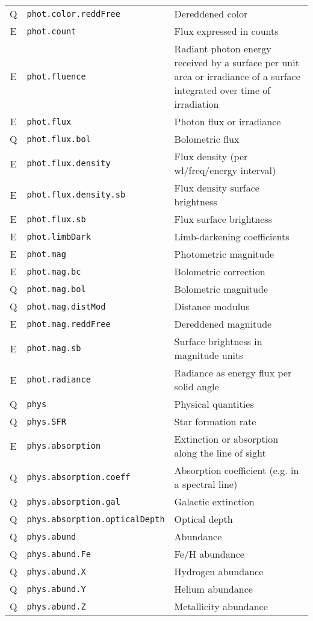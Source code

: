 \documentclass[11pt,a4paper]{ivoa}
\begin{document}
\begin{longtable}[h!]{c|p{40ex}|p{}}
Q & {\tt phot.color.reddFree} & Dereddened color\\
E & {\tt phot.count} & Flux expressed in counts\\
E & {\tt phot.fluence} & Radiant photon energy received by a surface per unit area or irradiance of a surface integrated over time of irradiation\\
E & {\tt phot.flux} & Photon flux or irradiance\\
Q & {\tt phot.flux.bol} & Bolometric flux\\
E & {\tt phot.flux.density} & Flux density (per wl/freq/energy interval)\\
E & {\tt phot.flux.density.sb} & Flux density surface brightness\\
E & {\tt phot.flux.sb} & Flux surface brightness\\
E & {\tt phot.limbDark} & Limb-darkening coefficients\\
E & {\tt phot.mag} & Photometric magnitude\\
E & {\tt phot.mag.bc} & Bolometric correction\\
Q & {\tt phot.mag.bol} & Bolometric magnitude\\
Q & {\tt phot.mag.distMod} & Distance modulus\\
E & {\tt phot.mag.reddFree} & Dereddened magnitude\\
E & {\tt phot.mag.sb} & Surface brightness in magnitude units\\
E & {\tt phot.radiance} & Radiance as energy flux per solid angle\\
Q & {\tt phys} & Physical quantities\\
Q & {\tt phys.SFR} & Star formation rate\\
E & {\tt phys.absorption} & Extinction or absorption along the line of sight\\
Q & {\tt phys.absorption.coeff} & Absorption coefficient (e.g. in a spectral line)\\
Q & {\tt phys.absorption.gal} & Galactic extinction\\
Q & {\tt phys.absorption.opticalDepth} & Optical depth\\
Q & {\tt phys.abund} & Abundance\\
Q & {\tt phys.abund.Fe} & Fe/H abundance\\
Q & {\tt phys.abund.X} & Hydrogen abundance\\
Q & {\tt phys.abund.Y} & Helium abundance\\
Q & {\tt phys.abund.Z} & Metallicity abundance\\

\end{longtable}
\end{document}
